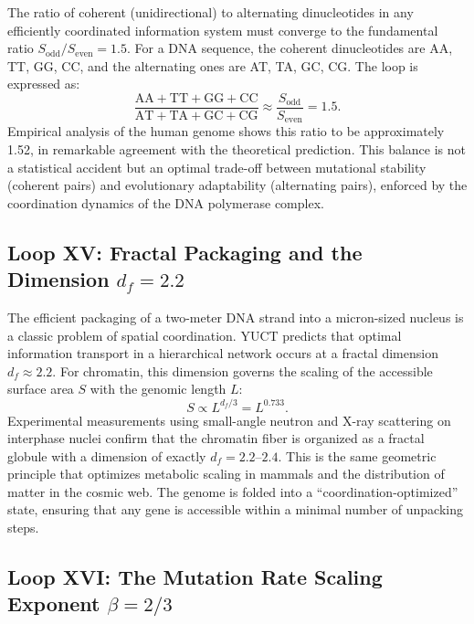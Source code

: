\documentclass[12pt]{article}
\begin{document}
	The ratio of coherent (unidirectional) to alternating dinucleotides in any efficiently coordinated information system must converge to the fundamental ratio \(S_{\mathrm{odd}}/S_{\mathrm{even}} = 1.5\). For a DNA sequence, the coherent dinucleotides are AA, TT, GG, CC, and the alternating ones are AT, TA, GC, CG. The loop is expressed as:
	\begin{equation}
		\boxed{ \frac{\text{AA} + \text{TT} + \text{GG} + \text{CC}}{\text{AT} + \text{TA} + \text{GC} + \text{CG}} \approx \frac{S_{\mathrm{odd}}}{S_{\mathrm{even}}} = 1.5 }.
	\end{equation}
	Empirical analysis of the human genome shows this ratio to be approximately 1.52, in remarkable agreement with the theoretical prediction. This balance is not a statistical accident but an optimal trade-off between mutational stability (coherent pairs) and evolutionary adaptability (alternating pairs), enforced by the coordination dynamics of the DNA polymerase complex.
	
	\subsection{Loop XV: Fractal Packaging and the Dimension \(d_f = 2.2\)}
	
	The efficient packaging of a two-meter DNA strand into a micron-sized nucleus is a classic problem of spatial coordination. YUCT predicts that optimal information transport in a hierarchical network occurs at a fractal dimension \(d_f \approx 2.2\). For chromatin, this dimension governs the scaling of the accessible surface area \(S\) with the genomic length \(L\):
	\begin{equation}
		\boxed{ S \propto L^{d_f/3} = L^{0.733} }.
	\end{equation}
	Experimental measurements using small-angle neutron and X-ray scattering on interphase nuclei confirm that the chromatin fiber is organized as a fractal globule with a dimension of exactly \(d_f = 2.2\)–\(2.4\). This is the same geometric principle that optimizes metabolic scaling in mammals and the distribution of matter in the cosmic web. The genome is folded into a ``coordination-optimized'' state, ensuring that any gene is accessible within a minimal number of unpacking steps.
	
	\subsection{Loop XVI: The Mutation Rate Scaling Exponent \(\beta = 2/3\)}
	
\end{document}
